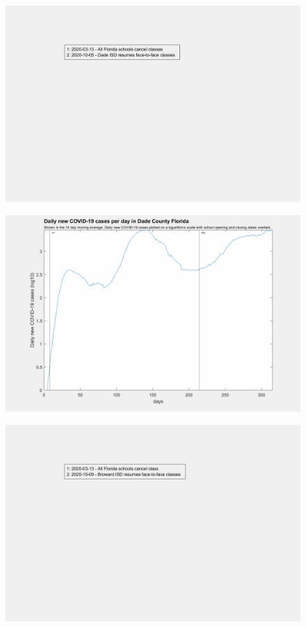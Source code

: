 \documentclass[]{article}
\begin{document}
\begin{figure}[!h]
	\includegraphics[width=\linewidth]{legends/dade_school_legend.png}
	\caption{}
	\label{fig:legends/dade_school_legendLabel}
\end{figure}

\begin{figure}[!h]
	\includegraphics[width=\linewidth]{images/dade_cases_school_log.png}
	\caption{}
	\label{fig:images/dade_cases_school_logLabel}
\end{figure}

\begin{figure}[!h]
	\includegraphics[width=\linewidth]{legends/broward_school_legend.png}
	\caption{}
	\label{fig:legends/broward_school_legendLabel}
\end{figure}
\end{document}
